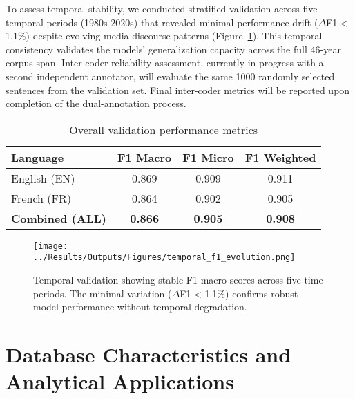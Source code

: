\documentclass[12pt]{article}
\begin{document}
To assess temporal stability, we conducted stratified validation across five temporal periods (1980s-2020s) that revealed minimal performance drift ($\Delta$F1 < 1.1\%) despite evolving media discourse patterns (Figure~\ref{fig:temporal_validation}). This temporal consistency validates the models' generalization capacity across the full 46-year corpus span. Inter-coder reliability assessment, currently in progress with a second independent annotator, will evaluate the same 1000 randomly selected sentences from the validation set. Final inter-coder metrics will be reported upon completion of the dual-annotation process.


\begin{table}[h!]
\centering
\caption{Overall validation performance metrics}
\label{tab:final_validation_metrics}
\begin{tabular}{lccc}
\toprule
\textbf{Language} & \textbf{F1 Macro} & \textbf{F1 Micro} & \textbf{F1 Weighted} \\
\midrule
English (EN) & 0.869 & 0.909 & 0.911 \\
French (FR) & 0.864 & 0.902 & 0.905 \\
\midrule
\textbf{Combined (ALL)} & \textbf{0.866} & \textbf{0.905} & \textbf{0.908} \\
\bottomrule
\end{tabular}
\end{table}

\begin{figure}[h!]
\centering
\texttt{[image: ../Results/Outputs/Figures/temporal\_f1\_evolution.png]}
\caption{Temporal validation showing stable F1 macro scores across five time periods. The minimal variation ($\Delta$F1 < 1.1\%) confirms robust model performance without temporal degradation.}
\label{fig:temporal_validation}
\end{figure}

\section{Database Characteristics and Analytical Applications}
\end{document}
